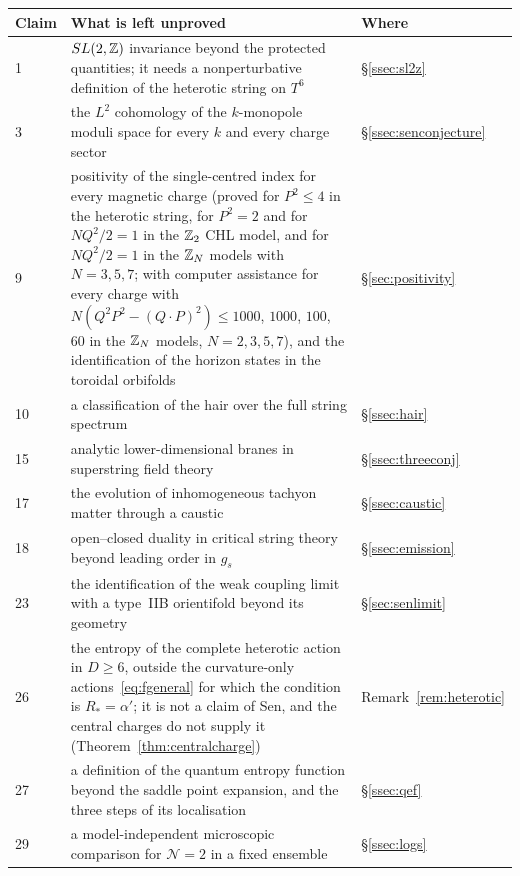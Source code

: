 \begin{table}[tbp]
\centering
\footnotesize
\setlength{\tabcolsep}{4pt}
\renewcommand{\arraystretch}{1.08}
\begin{tabular}{@{}p{}p{}p{}@{}}
\toprule
Claim & What is left unproved & Where \\
\midrule
1 & $SL(2,\mathbb{Z})$ invariance beyond the protected quantities; it needs a nonperturbative definition of the heterotic string on $T^6$ & \S\ref{ssec:sl2z} \\
3 & the $L^2$ cohomology of the $k$-monopole moduli space for every $k$ and every charge sector & \S\ref{ssec:senconjecture} \\
9 & positivity of the single-centred index for every magnetic charge (proved for $P^2\le4$ in the heterotic string, for $P^2=2$ and for $NQ^2/2=1$ in the $\mathbb{Z}_2$ CHL model, and for $NQ^2/2=1$ in the $\mathbb{Z}_N$ models with $N=3,5,7$; with computer assistance for every charge with $N(Q^2P^2-(Q\cdot P)^2)\le1000$, $1000$, $100$, $60$ in the $\mathbb{Z}_N$ models, $N=2,3,5,7$), and the identification of the horizon states in the toroidal orbifolds & \S\ref{sec:positivity} \\
10 & a classification of the hair over the full string spectrum & \S\ref{ssec:hair} \\
15 & analytic lower-dimensional branes in superstring field theory & \S\ref{ssec:threeconj} \\
17 & the evolution of inhomogeneous tachyon matter through a caustic & \S\ref{ssec:caustic} \\
18 & open--closed duality in critical string theory beyond leading order in $g_s$ & \S\ref{ssec:emission} \\
23 & the identification of the weak coupling limit with a type~IIB orientifold beyond its geometry & \S\ref{sec:senlimit} \\
26 & the entropy of the complete heterotic action in $D\ge6$, outside the curvature-only actions~\eqref{eq:fgeneral} for which the condition is $R_*=\alpha'$; it is not a claim of Sen, and the central charges do not supply it (Theorem~\ref{thm:centralcharge}) & Remark~\ref{rem:heterotic} \\
27 & a definition of the quantum entropy function beyond the saddle point expansion, and the three steps of its localisation & \S\ref{ssec:qef} \\
29 & a model-independent microscopic comparison for $\mathcal N=2$ in a fixed ensemble & \S\ref{ssec:logs} \\

\end{tabular}
\end{table}
